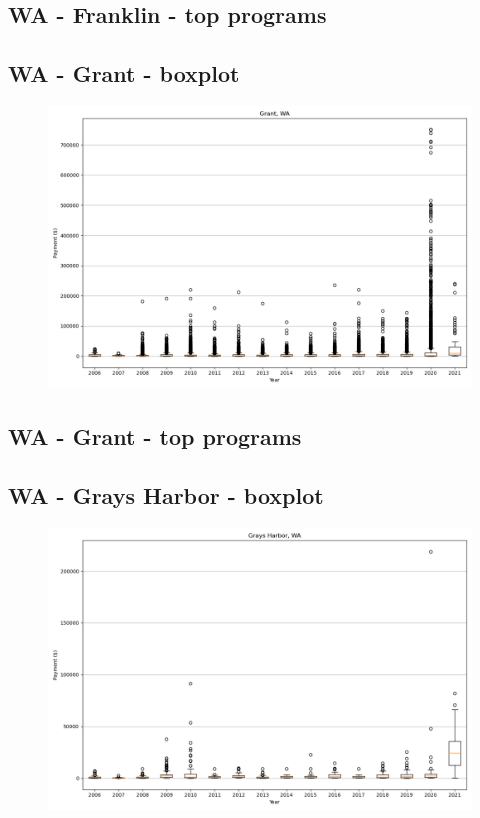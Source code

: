 \subsection*{WA - Franklin - top programs}

\newpage
\subsection*{WA - Grant - boxplot}
\begin{figure}[h]
\centering
\includegraphics[width=7in]{../output/boxplots/counties/Grant-WA_boxplot.png}
\end{figure}


\subsection*{WA - Grant - top programs}

\newpage
\subsection*{WA - Grays Harbor - boxplot}
\begin{figure}[h]
\centering
\includegraphics[width=7in]{../output/boxplots/counties/Grays Harbor-WA_boxplot.png}
\end{figure}


